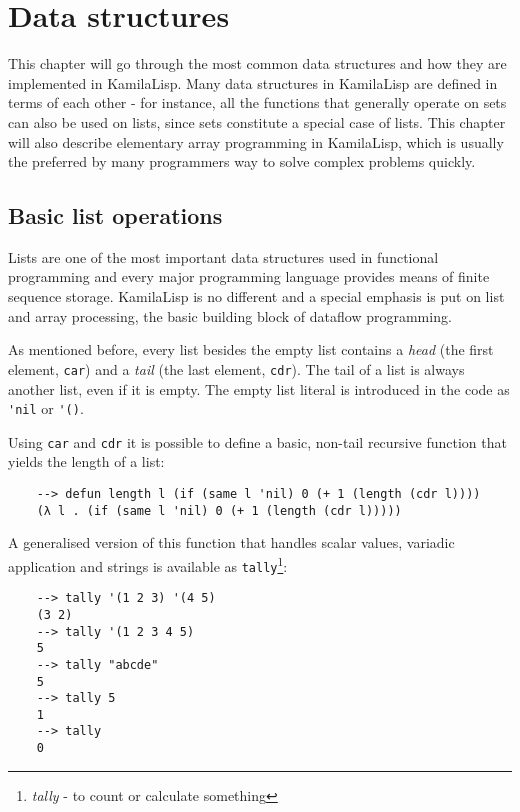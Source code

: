 
\chapter{Data structures}

This chapter will go through the most common data structures and how they are implemented in KamilaLisp. Many data structures in KamilaLisp are defined in terms of each other - for instance, all the functions that generally operate on sets can also be used on lists, since sets constitute a special case of lists. This chapter will also describe elementary array programming in KamilaLisp, which is usually the preferred by many programmers way to solve complex problems quickly.

\section{Basic list operations}

Lists are one of the most important data structures used in functional programming and every major programming language provides means of finite sequence storage. KamilaLisp is no different and a special emphasis is put on list and array processing, the basic building block of dataflow programming.

As mentioned before, every list besides the empty list contains a \textit{head} (the first element, \verb|car|) and a \textit{tail} (the last element, \verb|cdr|). The tail of a list is always another list, even if it is empty. The empty list literal is introduced in the code as \verb|'nil| or \verb|'()|. 

Using \verb|car| and \verb|cdr| it is possible to define a basic, non-tail recursive function that yields the length of a list:

\begin{Verbatim}
    --> defun length l (if (same l 'nil) 0 (+ 1 (length (cdr l))))
    (λ l . (if (same l 'nil) 0 (+ 1 (length (cdr l)))))
\end{Verbatim}

A generalised version of this function that handles scalar values, variadic application and strings is available as \verb|tally|\footnote{\textit{tally} - to count or calculate something}:

\begin{Verbatim}
    --> tally '(1 2 3) '(4 5)
    (3 2)
    --> tally '(1 2 3 4 5)
    5
    --> tally "abcde"
    5
    --> tally 5
    1
    --> tally
    0
\end{Verbatim}

